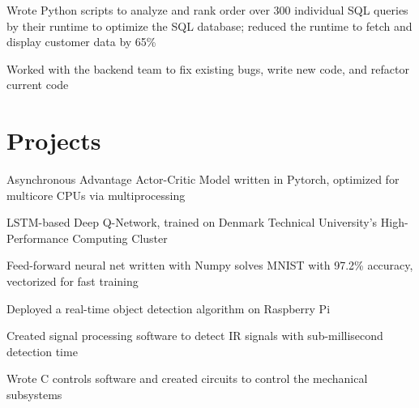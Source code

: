 \documentclass[]{deedy-resume-openfont}
\begin{document}
\vspace{8pt}

\begin{tightemize}
    \item Wrote Python scripts to analyze and rank order over 300 individual SQL queries by their runtime to optimize the SQL database; reduced the runtime to fetch and display customer data by 65\%
    \item Worked with the backend team to fix existing bugs, write new code, and refactor current code
\end{tightemize}

\vspace{12pt}


\section{Projects}

\begin{tightemize}
    \item Asynchronous Advantage Actor-Critic Model written in Pytorch, optimized for multicore CPUs via multiprocessing
    \item LSTM-based Deep Q-Network, trained on Denmark Technical University's High-Performance Computing Cluster
    \item Feed-forward neural net written with Numpy solves MNIST with 97.2\% accuracy, vectorized for fast training
\end{tightemize}

\vspace{8pt}

\begin{tightemize}
    \item Deployed a real-time object detection algorithm on Raspberry Pi
    \item Created signal processing software to detect IR signals with sub-millisecond detection time
    \item Wrote C controls software and created circuits to control the mechanical subsystems
\end{tightemize}

\vspace{12pt}
\end{document}
